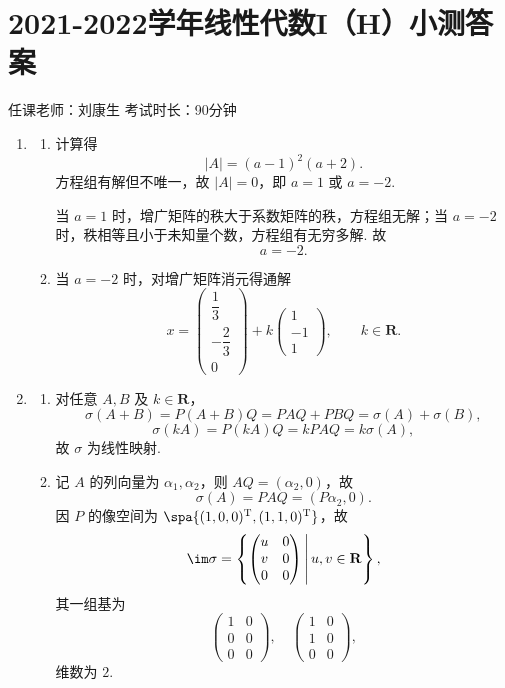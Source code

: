 \section{2021-2022学年线性代数I（H）小测答案}

\begin{center}
    任课老师：刘康生\hspace{4em} 考试时长：90分钟
\end{center}
\begin{enumerate}
    \item
    \begin{enumerate}
        \item 计算得
        \[
            |A|=(a-1)^2(a+2).
        \]
        方程组有解但不唯一，故 $|A|=0$，即 $a=1$ 或 $a=-2$.

        当 $a=1$ 时，增广矩阵的秩大于系数矩阵的秩，方程组无解；当 $a=-2$ 时，秩相等且小于未知量个数，方程组有无穷多解. 故
        \[
            a=-2.
        \]

        \item 当 $a=-2$ 时，对增广矩阵消元得通解
        \[
            x=\begin{pmatrix}\dfrac13\\[4pt]-\dfrac23\\[4pt]0\end{pmatrix}
            +k\begin{pmatrix}1\\-1\\1\end{pmatrix},\qquad k\in\mathbf{R}.
        \]
    \end{enumerate}

    \item
    \begin{enumerate}
        \item 对任意 $A,B$ 及 $k\in\mathbf{R}$，
        \[
            \sigma(A+B)=P(A+B)Q=PAQ+PBQ=\sigma(A)+\sigma(B),
        \]
        \[
            \sigma(kA)=P(kA)Q=kPAQ=k\sigma(A),
        \]
        故 $\sigma$ 为线性映射.

        \item 记 $A$ 的列向量为 $\alpha_1,\alpha_2$，则 $AQ=(\alpha_2,0)$，故
        \[
            \sigma(A)=PAQ=(P\alpha_2,0).
        \]
        因 $P$ 的像空间为 $\spa\{(1,0,0)^\mathrm{T},(1,1,0)^\mathrm{T}\}$，故
        \[
            \im\sigma
            =\left\{\begin{pmatrix}u&0\\v&0\\0&0\end{pmatrix}\,\middle|\,u,v\in\mathbf{R}\right\},
        \]
        其一组基为
        \[
            \begin{pmatrix}1&0\\0&0\\0&0\end{pmatrix},\quad
            \begin{pmatrix}1&0\\1&0\\0&0\end{pmatrix},
        \]
        维数为 $2$.


\end{enumerate}
\end{enumerate}
